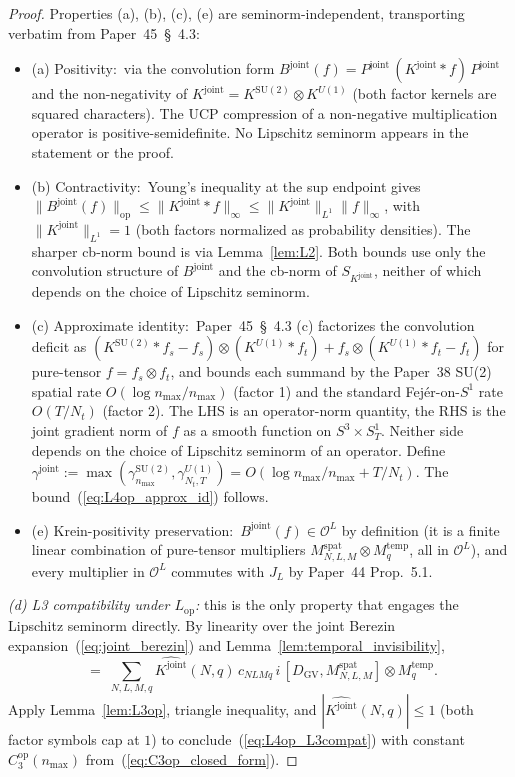 \documentclass[11pt,a4paper]{article}
\theoremstyle{plain}
\theoremstyle{definition}
\newcommand{\nmax}{n_{\max}}
\newcommand{\Nt}{N_{t}}
\newcommand{\Sone}{S^{1}}
\newcommand{\Manifold}{S^{3}\times S^{1}_{T}}
\newcommand{\Op}{\mathcal{O}}
\newcommand{\opnorm}[1]{\lVert #1 \rVert_{\mathrm{op}}}
\newcommand{\norm}[1]{\lVert #1 \rVert}
\newcommand{\SU}{\mathrm{SU}}
\newcommand{\Uone}{U(1)}
\newcommand{\DGV}{D_{\mathrm{GV}}}
\newcommand{\DL}{D_{L}}
\newcommand{\JL}{J_{L}}
\newcommand{\Lop}{L_{\mathrm{op}}}
\newcommand{\Bjoint}{B^{\mathrm{joint}}}
\newcommand{\Pjoint}{P^{\mathrm{joint}}}
\newcommand{\Kjoint}{K^{\mathrm{joint}}}
\newcommand{\KSU}{K^{\SU(2)}}
\newcommand{\KU}{K^{\Uone}}
\newcommand{\gammajoint}{\gamma^{\mathrm{joint}}}
\newcommand{\gammaSU}{\gamma^{\SU(2)}}
\newcommand{\gammaU}{\gamma^{\Uone}}
\newcommand{\Cthreeop}{C_{3}^{\mathrm{op}}}
\newcommand{\spat}{\mathrm{spat}}
\newcommand{\temp}{\mathrm{temp}}
\newcommand{\Plancherel}{\hat}
\begin{document}
\begin{proof}
Properties (a), (b), (c), (e) are seminorm-independent, transporting
verbatim from Paper~45~\S~4.3:
\begin{itemize}
\item (a) Positivity:\ via the convolution form
$\Bjoint(f) = \Pjoint\,(\Kjoint \ast f)\,\Pjoint$ and the non-negativity
of $\Kjoint = \KSU \otimes \KU$ (both factor kernels are squared
characters). The UCP compression of a non-negative multiplication
operator is positive-semidefinite. No Lipschitz seminorm appears in
the statement or the proof.
\item (b) Contractivity:\ Young's inequality at the sup endpoint gives
$\opnorm{\Bjoint(f)} \le \norm{\Kjoint \ast f}_{\infty} \le
\norm{\Kjoint}_{L^{1}} \norm{f}_{\infty}$, with $\norm{\Kjoint}_{L^{1}} = 1$
(both factors normalized as probability densities). The sharper cb-norm
bound is via Lemma~\ref{lem:L2}. Both bounds use only the convolution
structure of $\Bjoint$ and the cb-norm of $S_{\Kjoint}$, neither of
which depends on the choice of Lipschitz seminorm.
\item (c) Approximate identity:\ Paper~45~\S~4.3 (c) factorizes the
convolution deficit as $(\KSU \ast f_{s} - f_{s}) \otimes (\KU \ast f_{t})
+ f_{s} \otimes (\KU \ast f_{t} - f_{t})$ for pure-tensor
$f = f_{s} \otimes f_{t}$, and bounds each summand by the Paper~38
SU(2) spatial rate $O(\log \nmax / \nmax)$ (factor 1) and the standard
Fej\'er-on-$\Sone$ rate $O(T/\Nt)$ (factor 2). The LHS is an
operator-norm quantity, the RHS is the joint gradient norm of $f$ as a
smooth function on $\Manifold$. Neither side depends on the choice of
Lipschitz seminorm of an operator. Define
$\gammajoint := \max(\gammaSU_{\nmax}, \gammaU_{\Nt, T}) = O(\log\nmax/\nmax + T/\Nt)$.
The bound~(\ref{eq:L4op_approx_id}) follows.
\item (e) Krein-positivity preservation:\ $\Bjoint(f) \in \Op^{L}$ by
definition (it is a finite linear combination of pure-tensor multipliers
$M^{\spat}_{N, L, M} \otimes M^{\temp}_{q}$, all in $\Op^{L}$), and
every multiplier in $\Op^{L}$ commutes with $\JL$ by Paper~44 Prop.~5.1.
\end{itemize}

\emph{(d) L3 compatibility under $\Lop$:} this is the only property
that engages the Lipschitz seminorm directly. By linearity over the
joint Berezin expansion~(\ref{eq:joint_berezin}) and
Lemma~\ref{lem:temporal_invisibility},
\begin{equation*}
   [\DL, \Bjoint(f)] \;=\; \sum_{N, L, M, q} \Plancherel{\Kjoint}(N, q)\,c_{N L M q}\,
   i\,[\DGV, M^{\spat}_{N, L, M}] \otimes M^{\temp}_{q}.
\end{equation*}
Apply Lemma~\ref{lem:L3op}, triangle inequality, and
$|\Plancherel{\Kjoint}(N, q)| \le 1$ (both factor symbols cap at $1$)
to conclude~(\ref{eq:L4op_L3compat}) with constant $\Cthreeop(\nmax)$
from~(\ref{eq:C3op_closed_form}). \qedhere
\end{proof}
\end{document}
